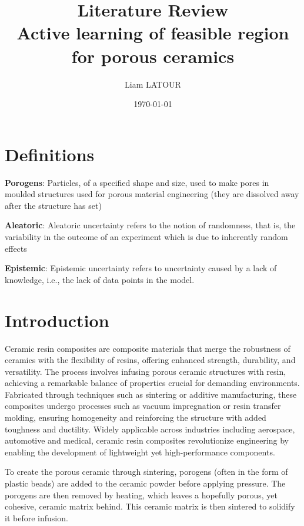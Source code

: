 \documentclass[11pt]{article}
\title{Literature Review \\ Active learning of feasible region for porous ceramics}
\date{\today}
\author{Liam LATOUR}
\begin{document}
\begin{titlingpage}
\maketitle
\end{titlingpage}

\tableofcontents
\pagebreak

\section*{Definitions}
\textbf{Porogens}\label{porogen}: Particles, of a specified shape and size, used to make pores in moulded structures used for porous material engineering (they are dissolved away after the structure has set)

\textbf{Aleatoric}\label{aleatoric}: Aleatoric uncertainty refers to the notion of randomness, that is, the variability in the outcome of an experiment which is due to inherently random effects

\textbf{Epistemic}\label{epistemic}: Epistemic uncertainty refers to uncertainty caused by a lack of knowledge, i.e., the lack of data points in the model.

\section{Introduction}
Ceramic resin composites are composite materials that merge the robustness of ceramics with the flexibility of resins, offering enhanced strength, durability, and versatility. The process involves infusing porous ceramic structures with resin, achieving a remarkable balance of properties crucial for demanding environments. Fabricated through techniques such as sintering\cite{leriche_sintering_2017} or additive manufacturing, these composites undergo processes such as vacuum impregnation or resin transfer molding, ensuring homogeneity and reinforcing the structure with added toughness and ductility. Widely applicable across industries including aerospace, automotive and medical, ceramic resin composites revolutionize engineering by enabling the development of lightweight yet high-performance components.

To create the porous ceramic through sintering\cite{ha_effect_2013}, porogens (often in the form of plastic beads) are added to the ceramic powder before applying pressure. The porogens are then removed by heating, which leaves a hopefully porous, yet cohesive, ceramic matrix behind. This ceramic matrix is then sintered to solidify it before infusion.
\end{document}
